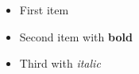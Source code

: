 \documentclass{article}
\begin{document}
\begin{itemize}
  \item First item
  \item Second item with \textbf{bold}
  \item Third with \textit{italic}
\end{itemize}
\end{document}
